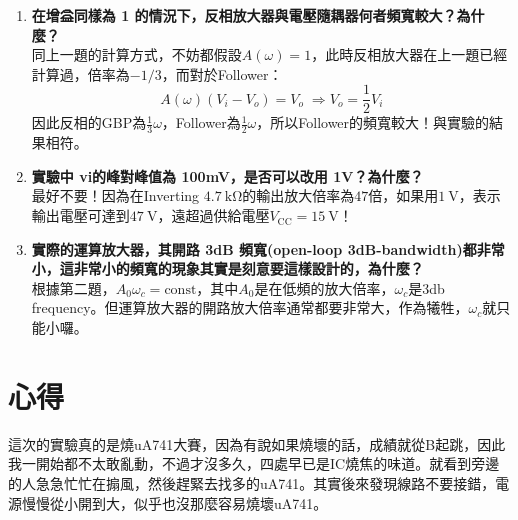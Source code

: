 \documentclass[12pt, a4paper]{article}
\def\large{\fontsize{14}{21}\selectfont}
\begin{document}
\begin{enumerate}[itemsep=20pt, topsep=10pt]
  \item {\large\bf 在增益同樣為 1 的情況下，反相放大器與電壓隨耦器何者頻寬較大？為什麼？} \\[10pt]
    同上一題的計算方式，不妨都假設$A(\omega) = 1$，此時反相放大器在上一題已經計算過，倍率為$-1/3$，而對於Follower：
    \[
      A(\omega) (V_i - V_o) = V_o \; \Rightarrow V_o = \frac{1}{2} V_i
    \]
    因此反相的GBP為$\frac{1}{3} \omega$，Follower為$\frac{1}{2} \omega$，所以Follower的頻寬較大！與實驗的結果相符。
  \item {\large\bf 實驗中 vi的峰對峰值為 100mV，是否可以改用 1V？為什麼？} \\[10pt]
    最好不要！因為在Inverting $\SI{4.7}\kohm$的輸出放大倍率為$47$倍，如果用$\SI{1}\V$，表示輸出電壓可達到$\SI{47}\V$，遠超過供給電壓$V_{\text{CC}} = \SI{15}\V$！
  \item {\large\bf 實際的運算放大器，其開路 3dB 頻寬(open-loop 3dB-bandwidth)都非常小，這非常小的頻寬的現象其實是刻意要這樣設計的，為什麼？} \\[10pt]
    根據第二題，$A_0 \omega_c = \text{const}$，其中$A_0$是在低頻的放大倍率，$\omega_c$是3db frequency。但運算放大器的開路放大倍率通常都要非常大，作為犧牲，$\omega_c$就只能小囉。 
\end{enumerate}

\section{心得}
這次的實驗真的是燒uA741大賽，因為有說如果燒壞的話，成績就從B起跳，因此我一開始都不太敢亂動，不過才沒多久，四處早已是IC燒焦的味道。就看到旁邊的人急急忙忙在搧風，然後趕緊去找多的uA741。其實後來發現線路不要接錯，電源慢慢從小開到大，似乎也沒那麼容易燒壞uA741。
\end{document}
